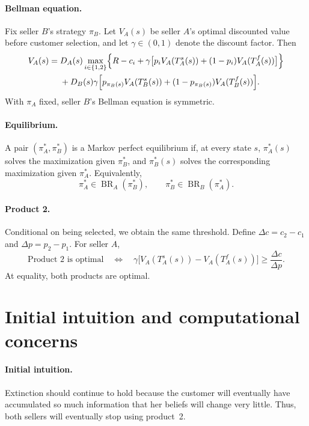 \documentclass[11pt]{article}
\DeclareMathOperator{\BR}{BR}
\begin{document}
\paragraph{Bellman equation.}
Fix seller $B$'s strategy $\pi_B$. Let $V_A(s)$ be seller $A$'s optimal
discounted value before customer selection, and let $\gamma\in(0,1)$
denote the discount factor. Then
\begin{equation}\label{eq:bellman}
\begin{aligned}
V_A(s)={}&D_A(s)\max_{i\in\{1,2\}}\Bigl\{
R-c_i+\gamma\bigl[p_iV_A(T_A^s(s))
 +(1-p_i)V_A(T_A^f(s))\bigr]\Bigr\}\\
&+D_B(s)\gamma\Bigl[
p_{\pi_B(s)}V_A(T_B^s(s))
 +(1-p_{\pi_B(s)})V_A(T_B^f(s))\Bigr].
\end{aligned}
\end{equation}
With $\pi_A$ fixed, seller $B$'s Bellman equation is symmetric.

\paragraph{Equilibrium.}
A pair $(\pi_A^*,\pi_B^*)$ is a Markov perfect equilibrium if, at every
state $s$, $\pi_A^*(s)$ solves the maximization given $\pi_B^*$, and
$\pi_B^*(s)$ solves the corresponding maximization given $\pi_A^*$.
Equivalently,
\begin{equation}
\boxed{\pi_A^*\in\BR_A(\pi_B^*),\qquad
       \pi_B^*\in\BR_B(\pi_A^*).}
\end{equation}

\paragraph{Product 2.}
Conditional on being selected, we obtain the same threshold. Define
$\Delta c=c_2-c_1$ and $\Delta p=p_2-p_1$. For seller $A$,
\begin{equation}\label{eq:threshold}
\boxed{\text{Product 2 is optimal}
\quad\Longleftrightarrow\quad
\gamma\bigl[V_A(T_A^s(s))-V_A(T_A^f(s))\bigr]
\geq\frac{\Delta c}{\Delta p}.}
\end{equation}
At equality, both products are optimal.

\section{Initial intuition and computational concerns}

\paragraph{Initial intuition.}
Extinction should continue to hold because the customer will eventually
have accumulated so much information that her beliefs will change very
little. Thus, both sellers will eventually stop using product~2.
\end{document}
